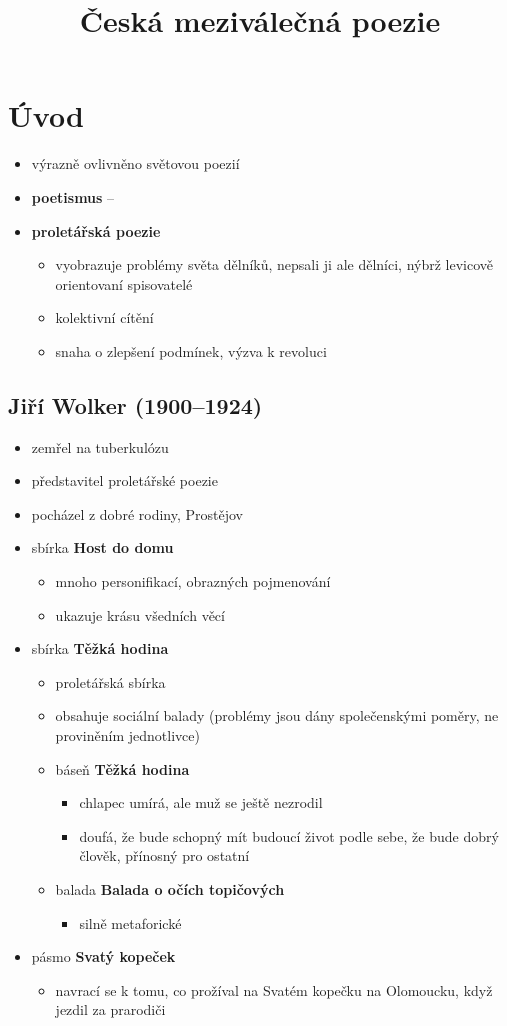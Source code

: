\title{Česká meziválečná poezie}

\section{Úvod}
\begin{itemize}
\item výrazně ovlivněno světovou poezií
\item \textbf{poetismus} -- 
\item \textbf{proletářská poezie} 
	\begin{itemize}
	\item vyobrazuje problémy světa dělníků, nepsali ji ale dělníci, nýbrž levicově orientovaní spisovatelé
	\item kolektivní cítění
	\item snaha o zlepšení podmínek, výzva k revoluci
	\end{itemize}
\end{itemize}

\subsection{Jiří Wolker (1900--1924)}
\begin{itemize}
\item zemřel na tuberkulózu
\item představitel proletářské poezie
\item pocházel z dobré rodiny, Prostějov
\item sbírka \textbf{Host do domu}
	\begin{itemize}
	\item mnoho personifikací, obrazných pojmenování
	\item ukazuje krásu všedních věcí
	\end{itemize}
\item sbírka \textbf{Těžká hodina}
	\begin{itemize}
	\item proletářská sbírka
	\item obsahuje sociální balady (problémy jsou dány společenskými poměry, ne proviněním jednotlivce)
	\item báseň \textbf{Těžká hodina} 
		\begin{itemize}
		\item chlapec umírá, ale muž se ještě nezrodil
		\item doufá, že bude schopný mít budoucí život podle sebe, že bude dobrý člověk, přínosný pro ostatní
		\end{itemize}
	\item balada \textbf{Balada o očích topičových}
		\begin{itemize}
		\item silně metaforické
		\end{itemize}
	\end{itemize}
\item pásmo \textbf{Svatý kopeček}
	\begin{itemize}
	\item navrací se k tomu, co prožíval na Svatém kopečku na Olomoucku, když jezdil za prarodiči	
	\end{itemize}
\end{itemize}

